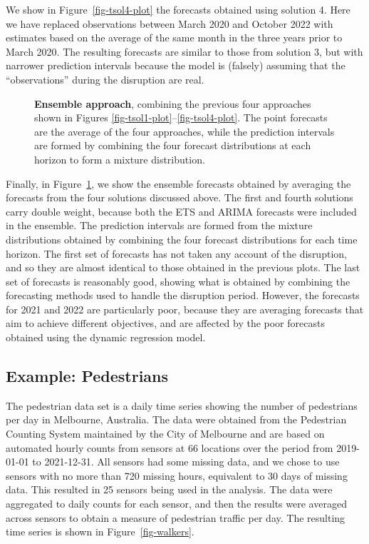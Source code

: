 \documentclass[
  11pt,
  a4paper,
]{article}
\begin{document}
We show in Figure~\ref{fig-tsol4-plot} the forecasts obtained using
solution 4. Here we have replaced observations between March 2020 and
October 2022 with estimates based on the average of the same month in
the three years prior to March 2020. The resulting forecasts are similar
to those from solution 3, but with narrower prediction intervals because
the model is (falsely) assuming that the ``observations'' during the
disruption are real.

\begin{figure}[!t]


\caption{\label{fig-tensemble-plot}\textbf{Ensemble approach}, combining
the previous four approaches shown in Figures
\ref{fig-tsol1-plot}--\ref{fig-tsol4-plot}. The point forecasts are the
average of the four approaches, while the prediction intervals are
formed by combining the four forecast distributions at each horizon to
form a mixture distribution.}

\end{figure}%

Finally, in Figure~\ref{fig-tensemble-plot}, we show the ensemble
forecasts obtained by averaging the forecasts from the four solutions
discussed above. The first and fourth solutions carry double weight,
because both the ETS and ARIMA forecasts were included in the ensemble.
The prediction intervals are formed from the mixture distributions
obtained by combining the four forecast distributions for each time
horizon. The first set of forecasts has not taken any account of the
disruption, and so they are almost identical to those obtained in the
previous plots. The last set of forecasts is reasonably good, showing
what is obtained by combining the forecasting methods used to handle the
disruption period. However, the forecasts for 2021 and 2022 are
particularly poor, because they are averaging forecasts that aim to
achieve different objectives, and are affected by the poor forecasts
obtained using the dynamic regression model.

\subsection{Example: Pedestrians}\label{example-pedestrians}

The pedestrian data set is a daily time series showing the number of
pedestrians per day in Melbourne, Australia. The data were obtained from
the Pedestrian Counting System maintained by the City of Melbourne
\autocite{pedestrians} and are based on automated hourly counts from
sensors at 66 locations over the period from 2019-01-01 to 2021-12-31.
All sensors had some missing data, and we chose to use sensors with no
more than 720 missing hours, equivalent to 30 days of missing data. This
resulted in 25 sensors being used in the analysis. The data were
aggregated to daily counts for each sensor, and then the results were
averaged across sensors to obtain a measure of pedestrian traffic per
day. The resulting time series is shown in Figure~\ref{fig-walkers}.
\end{document}
